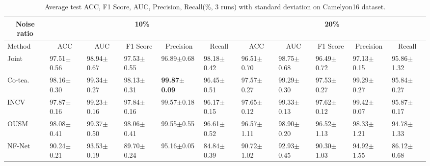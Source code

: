 \begin{table*}[]
\scriptsize
\centering
\caption{{Average test ACC, F1 Score, AUC, {Precision}, Recall(\%, 3 runs) with standard deviation on Camelyon16 dataset.}}
\label{table:objCamelyon}
\begin{tabular}{@{}lllllllllll@{}}
\toprule
\multicolumn{1}{c}{Noise ratio} & \multicolumn{5}{c}{10\%}                                                                                                                & \multicolumn{5}{c}{20\%}                                                                                                                \\ \midrule
Method                & \multicolumn{1}{c}{ACC} & \multicolumn{1}{c}{AUC} & \multicolumn{1}{c}{F1 Score} & \multicolumn{1}{c}{{Precision}} & \multicolumn{1}{c}{Recall} & \multicolumn{1}{c}{ACC} & \multicolumn{1}{c}{AUC} & \multicolumn{1}{c}{F1 Score} & \multicolumn{1}{c}{{Precision}} & \multicolumn{1}{c}{Recall} \\ \midrule
Joint                     & 97.51$\pm$0.56          & 98.94$\pm$0.67          & 97.53$\pm$0.55               & 96.89$\pm$0.68          & 98.18$\pm$0.42             & 96.51$\pm$0.70          & 98.75$\pm$0.68          & 96.49$\pm$0.72               & 97.13$\pm$0.15          & 95.86$\pm$1.32             \\
Co-tea.                     & 98.16$\pm$0.30          & 99.34$\pm$0.27          & 98.13$\pm$0.31               & \textbf{99.87$\pm$0.09} & 96.45$\pm$0.51             & 97.57$\pm$0.27          & 99.29$\pm$0.30          & 97.53$\pm$0.27               & 99.29$\pm$0.27          & 95.84$\pm$0.27             \\
INCV                            & 97.87$\pm$0.16          & 99.23$\pm$0.16          & 97.84$\pm$0.16               & 99.57$\pm$0.18          & 96.17$\pm$0.15             & 97.65$\pm$0.12          & 99.33$\pm$0.13          & 97.62$\pm$0.12               & 99.42$\pm$0.07          & 95.87$\pm$0.17             \\
OUSM                       & 98.08$\pm$0.41          & 99.37$\pm$0.50          & 98.06$\pm$0.41               & 99.55$\pm$0.55          & 96.61$\pm$0.52             & 96.57$\pm$1.11          & 98.90$\pm$0.20          & 96.52$\pm$1.13               & 98.33$\pm$1.21          & 94.78$\pm$1.33             \\
NF-Net                          & 90.24$\pm$0.21          & 93.53$\pm$0.19          & 89.70$\pm$0.24               & 95.16$\pm$0.05          & 84.84$\pm$0.39             & 90.72$\pm$1.02          & 92.93$\pm$0.45          & 90.30$\pm$1.03               & 94.92$\pm$1.55          & 86.12$\pm$0.68             \\

\end{tabular}
\end{table*}
